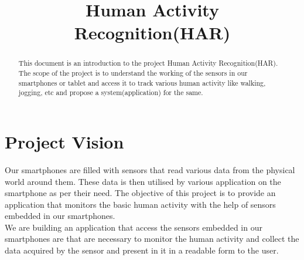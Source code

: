 \documentclass[conference]{IEEEtran}
\begin{document}
\title{Human Activity Recognition(HAR)}



\author{
\and
{}
\and
{}
}




\maketitle

\begin{abstract}
This document is an introduction to the project Human Activity Recognition(HAR). The scope of the project is to understand the working of the sensors in our smartphones or tablet and access it to track various human activity like walking, jogging, etc and propose a system(application) for the same.
\end{abstract}

\section{Project Vision}
Our smartphones are filled with sensors that read various data from the physical world around them. These data is then utilised by various application on the smartphone as per their need. The objective of this project is to provide an application that monitors the basic human activity with the help of sensors embedded in our smartphones. \\
We are building an application that access the sensors embedded in our smartphones are that are necessary to monitor the human activity and collect the data acquired by the sensor and present in it in a readable form to the user.
\end{document}
